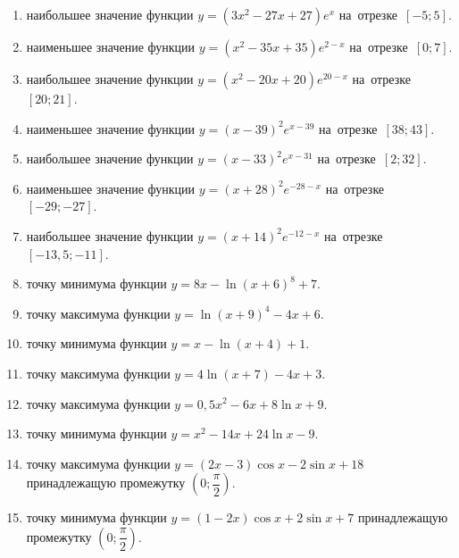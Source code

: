 \documentclass[a4paper,10pt]{article}
\begin{document}
\begin{enumerate}
\item {} наибольшее значение функции $y=\left(3x^2 -27x +27\right)e^{x}$ на~отрезке~$\left[-5;5\right]$.

\item {} наименьшее значение функции $y=\left(x^2 -35x +35\right)e^{2-x}$ на~отрезке~$\left[0;7\right]$.

\item {} наибольшее значение функции $y=\left(x^2 -20x +20\right)e^{20-x}$ на~отрезке~$\left[20;21\right]$.

\item {} наименьшее значение функции $y=\left(x-39\right)^2e^{x-39}$ на~отрезке~$\left[38;43\right]$.

\item {} наибольшее значение функции $y=\left(x-33\right)^2e^{x-31}$ на~отрезке~$\left[2;32\right]$.

\item {} наименьшее значение функции $y=\left(x+28\right)^2e^{-28-x}$ на~отрезке~$\left[-29;-27\right]$.

\item {} наибольшее значение функции $y=\left(x+14\right)^2e^{-12-x}$ на~отрезке~$\left[-13,5;-11\right]$.

\item {} точку минимума функции $y=8x-\ln\left(x+6\right)^{8}+7$.

\item {} точку максимума функции $y=\ln\left(x+9\right)^{4}-4x+6$.

\item {} точку минимума функции $y=x-\ln\left(x+4\right)+1$.

\item {} точку максимума функции $y=4\ln\left(x+7\right)-4x+3$.

\item {} точку максимума функции $y=0,5x^2-6x+8\ln x +9$.

\item {} точку минимума функции $y=x^2-14x+24\ln x -9$.

\item {} точку максимума функции $y=\left(2x-3\right)\cos x -2\sin x+18$
принадлежащую промежутку $\left(0;\dfrac{\pi}{2}\right)$.

\item {} точку минимума функции $y=\left(1-2x\right)\cos x +2\sin x+7$
принадлежащую промежутку $\left(0;\dfrac{\pi}{2}\right)$.


\end{enumerate}
\end{document}
